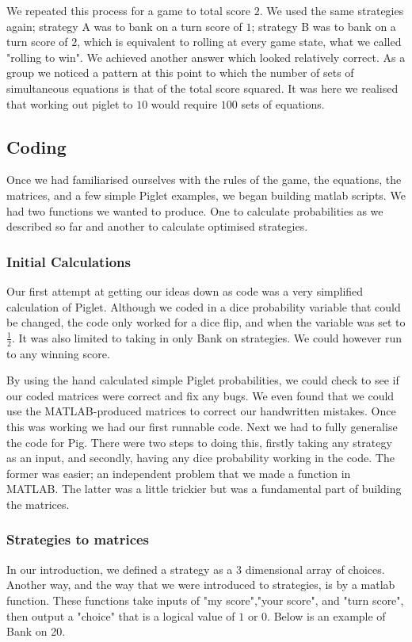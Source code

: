 \documentclass[a4paper,titlepage]{article}
\begin{document}
We repeated this process for a game to total score $2$. We used the same strategies again; strategy A was to bank on a turn score of $1$; strategy B was to bank on a turn score of $2$, which is equivalent to rolling at every game state, what we called "rolling to win". We achieved another answer which looked relatively correct. As a group we noticed a pattern at this point to which the number of sets of simultaneous equations is that of the total score squared. It was here we realised that working out piglet to $10$ would require $100$ sets of equations.

\subsection{Coding}
Once we had familiarised ourselves with the rules of the game, the equations, the matrices, and a few simple Piglet examples, we began building matlab scripts. We had two functions we wanted to produce. One to calculate probabilities as we described so far and another to calculate optimised strategies.

\subsubsection{Initial Calculations}
Our first attempt at getting our ideas down as code was a very simplified calculation of Piglet. Although we coded in a dice probability variable that could be changed, the code only worked for a dice flip, and when the variable was set to $\frac{1}{2}$. It was also limited to taking in only Bank on strategies. We could however run to any winning score.

By using the hand calculated simple Piglet probabilities, we could check to see if our coded matrices were correct and fix any bugs. We even found that we could use the MATLAB-produced matrices to correct our handwritten mistakes. Once this was working we had our first runnable code. Next we had to fully generalise the code for Pig. There were two steps to doing this, firstly taking any strategy as an input, and secondly, having any dice probability working in the code. The former was easier; an independent problem that we made a function in MATLAB. The latter was a little trickier but was a fundamental part of building the matrices.

\subsubsection{Strategies to matrices}
In our introduction, we defined a strategy as a 3 dimensional array of choices. Another way, and the way that we were introduced to strategies, is by a matlab function. These functions take inputs of "my score","your score", and "turn score", then output a "choice" that is a logical value of $1$ or $0$. Below is an example of Bank on 20.
\end{document}
